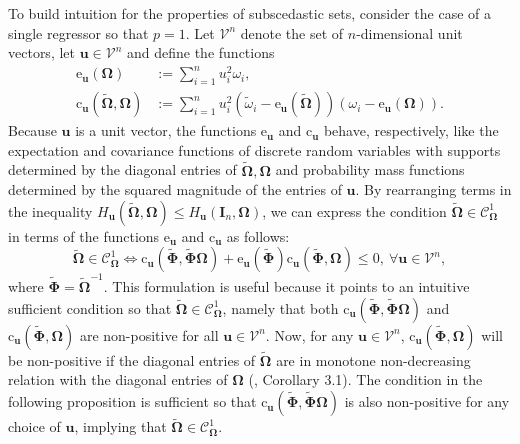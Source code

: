 \documentclass[12pt]{article}
\newcommand{\bl}[1]{{\mathbf #1}}
\newcommand{\bs}[1]{\boldsymbol #1}
\begin{document}
To build intuition for the properties of subscedastic sets, consider the case of a single regressor so that $p=1$. Let $\mathcal{V}^n$ denote the set of $n$-dimensional unit vectors, let $\bl{u} \in \mathcal{V}^n$ and define the functions
\begin{equation*}
    \begin{aligned}
        \mathrm{e}_{\bl{u}}(\bs{\Omega}) &:= \sum_{i=1}^n u_i^2 \omega_i, \\
        \mathrm{c}_{\bl{u}}(\tilde{\bs{\Omega}}, \bs{\Omega}) &:= \sum_{i=1}^n u_i^2(\tilde{\omega}_i - \mathrm{e}_{\bl{u}}(\tilde{\bs{\Omega}}))(\omega_i - \mathrm{e}_{\bl{u}}(\bs{\Omega})).
    \end{aligned}
\end{equation*}
Because $\bl{u}$ is a unit vector, the functions $\mathrm{e}_{\bl{u}}$ and $ \mathrm{c}_{\bl{u}}$ behave, respectively, like the expectation and covariance functions of discrete random variables with supports determined by the diagonal entries of $\tilde{\bs{\Omega}}, \bs{\Omega}$ and probability mass functions determined by the squared magnitude of the entries of $\bl{u}$. By rearranging terms in the inequality $H_{\bl{u}}(\tilde{\bs{\Omega}}, \bs{\Omega}) \leq H_{\bl{u}}(\bl{I}_n, \bs{\Omega})$, we can express the condition $\tilde{\bs{\Omega}} \in \mathcal{C}^1_{\bs{\Omega}}$ in terms of the functions $\mathrm{e}_{\bl{u}}$ and $\mathrm{c}_{\bl{u}}$ as follows:
\begin{equation}\label{eq:rearr}
        \tilde{\bs{\Omega}} \in \mathcal{C}^1_{\bs{\Omega}} \iff \mathrm{c}_{\bl{u}}(\tilde{\bs{\Phi}}, \tilde{\bs{\Phi}}\bs{\Omega}) + \mathrm{e}_{\bl{u}}(\tilde{\bs{\Phi}}) \mathrm{c}_{\bl{u}}(\tilde{\bs{\Phi}}, \bs{\Omega}) \leq 0,~\forall \bl{u} \in \mathcal{V}^n,
\end{equation}
where $\tilde{\bs{\Phi}} = \tilde{\bs{\Omega}}^{-1}$. This formulation is useful because it points to an intuitive sufficient condition so that $\tilde{\bs{\Omega}} \in \mathcal{C}^1_{\bs{\Omega}}$, namely that both $\mathrm{c}_{\bl{u}}(\tilde{\bs{\Phi}}, \tilde{\bs{\Phi}}\bs{\Omega})$ and $\mathrm{c}_{\bl{u}}(\tilde{\bs{\Phi}}, \bs{\Omega})$ are non-positive for all $\bl{u} \in \mathcal{V}^n$. Now, for any $\bl{u} \in \mathcal{V}^n$, $\mathrm{c}_{\bl{u}}(\tilde{\bs{\Phi}}, \bs{\Omega})$ will be non-positive if the diagonal entries of $\tilde{\bs{\Omega}}$ are in monotone non-decreasing relation with the diagonal entries of $\bs{\Omega}$ (\citealp{schmidt_inequalities_2014}, Corollary 3.1). The condition in the following proposition is sufficient so that $\mathrm{c}_{\bl{u}}(\tilde{\bs{\Phi}}, \tilde{\bs{\Phi}}\bs{\Omega})$ is also non-positive for any choice of $\bl{u}$, implying that $\tilde{\bs{\Omega}} \in \mathcal{C}^1_{\bs{\Omega}}$.
\end{document}
